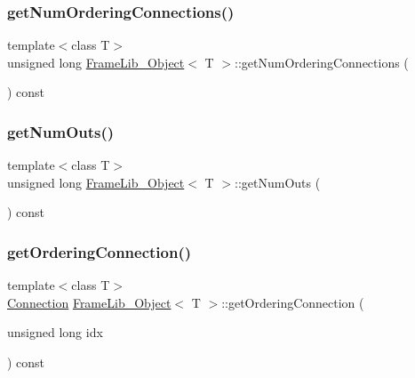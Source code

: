 \mbox{\label{class_frame_lib___object_ace330616fd3334122babc5901b758d28}} 
\subsubsection{\texorpdfstring{get\+Num\+Ordering\+Connections()}{getNumOrderingConnections()}}
{\footnotesize\ttfamily template$<$class T$>$ \\
unsigned long \hyperlink{class_frame_lib___object}{Frame\+Lib\+\_\+\+Object}$<$ T $>$\+::get\+Num\+Ordering\+Connections (\begin{DoxyParamCaption}{ }\end{DoxyParamCaption}) const\hspace{0.3cm}{\ttfamily [inline]}}

\mbox{\label{class_frame_lib___object_a255f6ae814dbb946d445ef244dd39975}} 
\subsubsection{\texorpdfstring{get\+Num\+Outs()}{getNumOuts()}}
{\footnotesize\ttfamily template$<$class T$>$ \\
unsigned long \hyperlink{class_frame_lib___object}{Frame\+Lib\+\_\+\+Object}$<$ T $>$\+::get\+Num\+Outs (\begin{DoxyParamCaption}{ }\end{DoxyParamCaption}) const\hspace{0.3cm}{\ttfamily [inline]}}

\mbox{\label{class_frame_lib___object_ad67d23eb04120b30c16b0a213b3d3303}} 
\subsubsection{\texorpdfstring{get\+Ordering\+Connection()}{getOrderingConnection()}}
{\footnotesize\ttfamily template$<$class T$>$ \\
\hyperlink{struct_frame_lib___object_1_1_connection}{Connection} \hyperlink{class_frame_lib___object}{Frame\+Lib\+\_\+\+Object}$<$ T $>$\+::get\+Ordering\+Connection (\begin{DoxyParamCaption}\item[{unsigned long}]{idx }\end{DoxyParamCaption}) const\hspace{0.3cm}{\ttfamily [inline]}}


